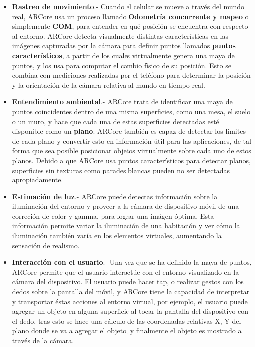 \begin{itemize}
	\item \textbf{Rastreo de movimiento}.- Cuando el celular se mueve a través del mundo real, ARCore usa un proceso llamado \textbf{Odometría concurrente y mapeo} o simplemente \textbf{COM}, para entender en qué posición se encuentra con respecto al entorno. ARCore detecta visualmente distintas características en las imágenes capturadas por la cámara para definir puntos llamados \textbf{puntos característicos}, a partir de los cuales virtualmente genera una maya de puntos, y los usa para computar el cambio físico de su posición. Esto se combina con mediciones realizadas por el teléfono para determinar la posición y la orientación de la cámara relativa al mundo en tiempo real.
	
	\item \textbf{Entendimiento ambiental}.- ARCore trata de identificar una maya de puntos coincidentes dentro de una misma superficies, como una mesa, el suelo o un muro, y hace que cada una de estas superficies detectadas esté disponible como un \textbf{plano}. ARCore también es capaz de detectar los límites de cada plano y convertir esto en información útil para las aplicaciones, de tal forma que sea posible posicionar objetos virtualmente sobre cada uno de estos planos. Debido a que ARCore usa puntos característicos para detectar planos, superficies sin texturas como parades blancas pueden no ser detectadas apropiadamente.
	
	\item \textbf{Estimación de luz}.- ARCore puede detectas información sobre la iluminación del entorno y proveer a la cámara de dispositivo móvil de una correción de color y gamma, para lograr una imágen óptima. Esta información permite variar la iluminación de una habitación y ver cómo la iluminación también varía en los elementos virtuales, aumentando la sensación de realismo.
	
	\item \textbf{Interacción con el usuario}.- Una vez que se ha definido la maya de puntos, ARCore permite que el usuario interactúe con el entorno visualizado en la cámara del dispositivo. El usuario puede hacer tap, o realizar gestos con los dedos sobre la pantalla del móvil, y ARCore tiene la capacidad de interpretar y transportar éstas acciones al entorno virtual, por ejemplo, el usuario puede agregar un objeto en alguna superficie al tocar la pantalla del dispositivo con el dedo, tras esto se hace una cálculo de las coordenadas relativas X, Y del plano donde se va a agregar el objeto, y finalmente el objeto es mostrado a través de la cámara.
	

\end{itemize}

